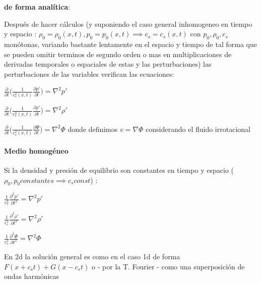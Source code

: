 \documentclass{article}
\begin{document}
\textbf{de forma analítica}:

\begin{description}  



\item Después de hacer cálculos (y suponiendo el caso general inhomogeneo en tiempo y espacio : 
$\rho_0 = \rho_0(x,t),p_0 = p_0(x,t) \implies c_s = c_s(x,t)$ 
con  $p_0, \rho_0, c_s$  monótonas, variando bastante lentamente en el espacio y tiempo de tal forma que se pueden omitir terminos de segundo orden o mas en multiplicaciones de derivadas temporales o espaciales de estas y las perturbaciones) las perturbaciones de las variables verifican las ecuaciones: 

\item $\frac{\partial}{\partial t} \big(\frac{1}{c_s^{2}(x,t)} \frac{\partial p\prime}{\partial t}\big) = \nabla^{2} p\prime    $
\item $\frac{\partial}{\partial t} \big(\frac{1}{c_s^{2}(x,t)} \frac{\partial \rho\prime}{\partial t}\big) = \nabla^{2} \rho\prime    $
\item $\frac{\partial}{\partial t} \big(\frac{1}{c_s^{2}(x,t)} \frac{\partial \Phi}{\partial t}\big) = \nabla^{2} \Phi $ donde definimos  $v = \nabla \Phi$ considerando el fluido irrotacional

\end{description}  

\paragraph{Medio homogéneo}

\begin{description}  
\item Si la densidad y presión de equilibrio son constantes en tiempo y espacio ($\rho_0, p_0 constantes \implies c_s const$) :
\item $\frac{1}{c_s^{2}} \frac{\partial^{2} p\prime}{\partial t^{2}} = \nabla^{2} p\prime    $
\item $\frac{1}{c_s^{2}} \frac{\partial^{2} \rho\prime}{\partial t^{2}} = \nabla^{2} \rho\prime    $
\item $\frac{1}{c_s^{2}} \frac{\partial^{2} \Phi}{\partial t^{2}} = \nabla^{2} \Phi    $
\item En 2d  la solución general es como en el caso 1d de forma $F(x+c_s t) + G(x-c_s t)$ o - por la T. Fourier - como una superposición de ondas harmónicas 

\end{description}  
\end{document}
